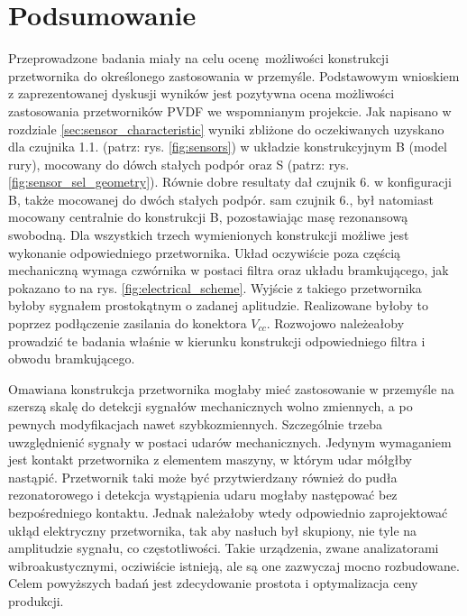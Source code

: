\chapter{Podsumowanie}
\label{sec:conclusion}

\indent Przeprowadzone badania miały na celu ocenę możliwości konstrukcji przetwornika 
do określonego zastosowania w przemyśle. Podstawowym wnioskiem z zaprezentowanej dyskusji
wyników jest pozytywna ocena możliwości zastosowania przetworników PVDF we wspomnianym
projekcie. Jak napisano w rozdziale \ref{sec:sensor_characteristic} wyniki zbliżone do
oczekiwanych uzyskano dla czujnika 1.1. (patrz: rys. \ref{fig:sensors}) w układzie 
konstrukcyjnym B (model rury), mocowany do dówch stałych podpór
 oraz S (patrz: rys. \ref{fig:sensor_sel_geometry}). Równie dobre
resultaty dał czujnik 6. w konfiguracji B, także mocowanej do dwóch stałych podpór.
sam czujnik 6., był natomiast mocowany centralnie do konstrukcji B, pozostawiając 
masę rezonansową swobodną. Dla wszystkich trzech wymienionych konstrukcji możliwe jest
wykonanie odpowiedniego przetwornika. Układ oczywiście poza częścią mechaniczną
wymaga czwórnika w postaci filtra oraz układu bramkującego, jak pokazano to na 
rys. \ref{fig:electrical_scheme}. Wyjście z takiego przetwornika byłoby sygnałem 
prostokątnym o zadanej aplitudzie. Realizowane byłoby to poprzez podłączenie zasilania
do konektora $V_{cc}$. Rozwojowo należeałoby prowadzić te badania właśnie w kierunku
konstrukcji odpowiedniego filtra i obwodu bramkującego. 

\indent Omawiana konstrukcja przetwornika mogłaby mieć zastosowanie w przemyśle na
szerszą skalę do detekcji sygnałów mechanicznych wolno zmiennych, a po pewnych 
modyfikacjach nawet szybkozmiennych. Szczególnie trzeba uwzględnienić sygnały w postaci
udarów mechanicznych.
Jedynym wymaganiem jest kontakt przetwornika z elementem maszyny, w którym udar mółgłby
nastąpić. Przetwornik taki może być przytwierdzany również do pudła rezonatorowego
i detekcja wystąpienia udaru mogłaby następować bez bezpośredniego kontaktu. Jednak 
należałoby wtedy odpowiednio zaprojektować ukłąd elektryczny przetwornika, tak aby nasłuch 
był skupiony, nie tyle na amplitudzie sygnału, co częstotliwości. Takie urządzenia, zwane
analizatorami wibroakustycznymi, ocziwiście istnieją, ale są one zazwyczaj mocno rozbudowane.
Celem powyższych badań jest zdecydowanie prostota i optymalizacja ceny produkcji.


